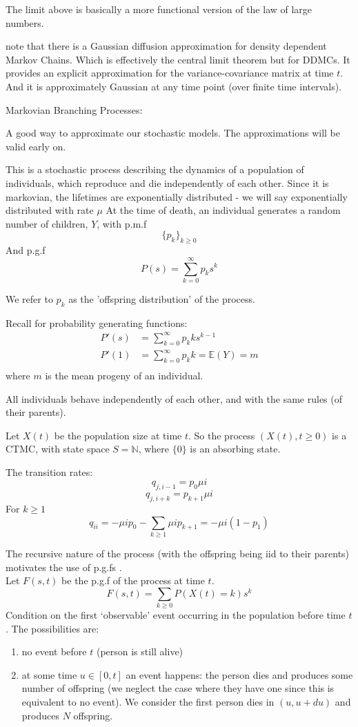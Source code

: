 \documentclass{/home/janmebows/Documents/LatexTemplates/myassignment}
\begin{document}
The limit above is basically a more functional version of the law of large numbers.

note that there is a Gaussian diffusion approximation for density dependent Markov Chains. Which is effectively the central limit theorem but for DDMCs. It provides an explicit approximation for the variance-covariance matrix at time $t$. And it is approximately Gaussian at any time point (over finite time intervals).



Markovian Branching Processes:

A good way to approximate our stochastic models. The approximations will be valid early on.


This is a stochastic process describing the dynamics of a population of individuals, which reproduce and die independently of each other. Since it is markovian, the lifetimes are exponentially distributed - we will say exponentially distributed with rate $\mu$
At the time of death, an individual generates a random number of children, $Y$, with p.m.f
\[\{p_{k}\}_{k\geq0}\]
And p.g.f
\[P(s) = \sum_{k=0}^\infty p_k s^k\]

We refer to $p_k$ as the 'offspring distribution' of the process.

Recall for probability generating functions:
\begin{align*}
    P'(s) &= \sum_{k=0}^\infty p_k k s^{k-1}\\
    P'(1) &=\sum_{k=0}^\infty p_k k = \mathbb{E}(Y)=m\\
\end{align*}
where $m$ is the mean progeny of an individual.

All individuals behave independently of each other, and with the same rules (of their parents).

Let $X(t)$ be the population size at time $t$. So the process $(X(t), t \geq 0)$ is a CTMC, with state space $S = \mathbb{N}$, where $\{0\}$ is an absorbing state.

The transition rates:
\[q_{j,i-1} = p_0\mu i\]
\[q_{j,i+k} = p_{k+1}\mu i\]
For $k \geq 1$
\[q_{ii} = -\mu i p_0 - \sum_{k\geq1} \mu i p_{k+1} = -\mu i(1-p_1)\]

The recursive nature of the process (with the offspring being iid to their parents) motivates the use of p.g.fs .\\
Let $F(s,t)$ be the p.g.f of the process at time $t$.
\[F(s,t) = \sum_{k\geq0} P(X(t) = k)s^k\]
Condition on the first `observable' event occurring in the population before time $t$. The possibilities are: 
\begin{enumerate}
    \item no event before $t$ (person is still alive)
    \item at some time $u \in [0,t]$ an event happens: the person dies and produces some number of offspring (we neglect the case where they have one since this is equivalent to no event). We consider the first person dies in $(u,u+du)$ and produces $N$ offspring. 
\end{enumerate}
\end{document}
